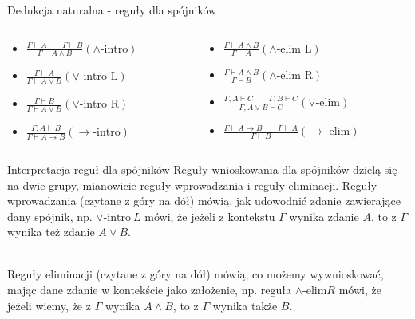 \documentclass{beamer}
\newcommand{\impl}{\rightarrow}
\renewcommand{\implies}{\rightarrow}
\begin{document}
\begin{frame}{Dedukcja naturalna - reguły dla spójników}
\begin{columns}
	\begin{column}{0.6\textwidth}
	\begin{itemize}
		\setlength\itemsep{2em}
		\item $\displaystyle \frac{\Gamma \vdash A \qquad \Gamma \vdash B}{\Gamma \vdash A \land B} (\land\text{-intro})$
		\item $\displaystyle \frac{\Gamma \vdash A}{\Gamma \vdash A \lor B} (\lor\text{-intro L})$
		\item $\displaystyle \frac{\Gamma \vdash B}{\Gamma \vdash A \lor B} (\lor\text{-intro R})$
		\item $\displaystyle \frac{\Gamma, A \vdash B}{\Gamma \vdash A \implies B} (\implies\text{-intro})$
	\end{itemize}
	\end{column}
	
	\begin{column}{0.6\textwidth}
	\begin{itemize}
		\setlength\itemsep{2em}
		\item $\displaystyle \frac{\Gamma \vdash A \land B}{\Gamma \vdash A} (\land\text{-elim L})$
		\item $\displaystyle \frac{\Gamma \vdash A \land B}{\Gamma \vdash B} (\land\text{-elim R})$
		\item $\displaystyle \frac{\Gamma, A \vdash C \qquad \Gamma, B \vdash C}{\Gamma, A \lor B \vdash C} (\lor\text{-elim})$
		\item $\displaystyle \frac{\Gamma \vdash A \impl B \qquad \Gamma \vdash A}{\Gamma \vdash B} (\impl\text{-elim})$
	\end{itemize}
	\end{column}
\end{columns}
\end{frame}

\begin{frame}{Interpretacja reguł dla spójników}
	Reguły wnioskowania dla spójników dzielą się na dwie grupy, mianowicie reguły wprowadzania i reguły eliminacji. Reguły wprowadzania (czytane z góry na dół) mówią, jak udowodnić zdanie zawierające dany spójnik, np. $\lor\text{-intro}\ L$ mówi, że jeżeli z kontekstu $\Gamma$ wynika zdanie $A$, to z $\Gamma$ wynika też zdanie $A \lor B$. \\~\
	
	Reguły eliminacji (czytane z góry na dół) mówią, co możemy wywnioskować, mając dane zdanie w kontekście jako założenie, np. reguła $\land\text{-elim} R$ mówi, że jeżeli wiemy, że z $\Gamma$ wynika $A \land B$, to z $\Gamma$ wynika także $B$.
\end{frame}
\end{document}
